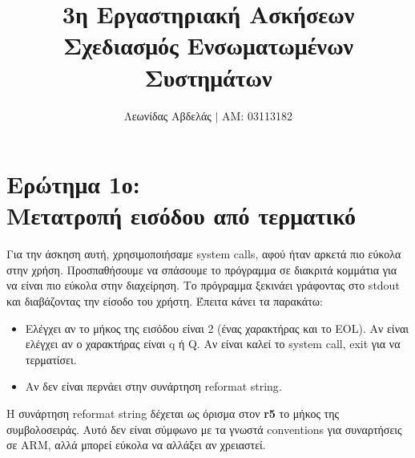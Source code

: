 \documentclass{article}
\title{3η Εργαστηριακή Ασκήσεων \\
        Σχεδιασμός Ενσωματωμένων Συστημάτων}
\newcommand{\english}[1]{\foreignlanguage{english}{{#1}}}
\begin{document}
\date{}
\author{Λεωνίδας Αβδελάς $|$ ΑΜ: 03113182}

\maketitle
\newpage

\section*{Ερώτημα 1ο: \\ Μετατροπή εισόδου από τερματικό}

Για την άσκηση αυτή, χρησιμοποιήσαμε \english{system calls}, αφού ήταν αρκετά πιο εύκολα στην χρήση. Προσπαθήσουμε να σπάσουμε το πρόγραμμα σε διακριτά κομμάτια για να είναι πιο εύκολα στην διαχείρηση. Το πρόγραμμα ξεκινάει γράφοντας στο \english{stdout} και διαβάζοντας την είσοδο του χρήστη. Έπειτα κάνει τα παρακάτω:

\begin{itemize}
    \item Ελέγχει αν το μήκος της εισόδου είναι 2 (ένας χαρακτήρας και το \english{EOL}). Αν είναι ελέγχει αν ο χαρακτήρας είναι \english{q} ή \english{Q}. Αν είναι καλεί το \english{system call, exit} για να τερματίσει.
    \item Αν δεν είναι περνάει στην συνάρτηση \english{reformat string}. 
\end{itemize}

Η συνάρτηση \english{reformat string} δέχεται ως όρισμα στον \english{\textbf{r5}} το μήκος της συμβολοσειράς. Αυτό δεν είναι σύμφωνο με τα γνωστά \english{conventions} για συναρτήσεις σε \english{ARM}, αλλά μπορεί εύκολα να αλλάξει αν χρειαστεί. 
\end{document}
